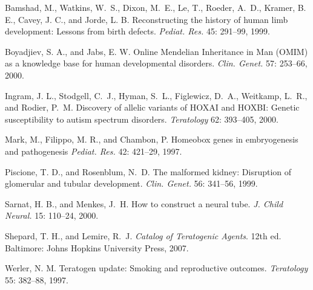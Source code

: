 \begin{references}



\item Bamshad, M., Watkins, W.~S., Dixon, M.~E., Le, T., Roeder, A.~D.,
Kramer, B. E., Cavey, J. C., and Jorde, L. B.
Reconstructing the history of human limb development:
Lessons from birth defects. {\it Pediat. Res.} 45: 291--99, 1999.

\item Boyadjiev, S. A., and Jabs, E. W.
Online Mendelian Inheritance in Man (OMIM) as a knowledge base
for human developmental disorders.  {\it Clin. Genet.}  57: 253--66, 2000.

\item Ingram, J. L., Stodgell, C.~J., Hyman, S.~L., Figlewicz, D.~A.,
Weitkamp, L.~R., and Rodier, P.~M.
Discovery of allelic variants of HOXAI and HOXBI:
Genetic susceptibility to autism spectrum disorders.
 {\it Teratology} 62: 393--405, 2000.

\item Mark, M., Filippo, M. R., and Chambon, P.
Homeobox genes in embryogenesis and pathogenesis {\it Pediat. Res.} 
42: 421--29, 1997.

\item Piscione, T. D., and Rosenblum, N.~D. 
The malformed kidney: Disruption of glomerular and tubular development.
 {\it Clin. Genet.}  56: 341--56, 1999.

\item Sarnat, H. B., and Menkes, J.~H.  How to construct a neural tube.
{\it J. Child Neural.}  15: 110--24, 2000.

\item Shepard, T. H., and Lemire, R.~J.  {\it Catalog of Teratogenic Agents}. 
12th ed. Baltimore: Johns Hopkins University Press, 2007.

\item Werler, N. M.  Teratogen update: Smoking and reproductive outcomes. 
{\it Teratology} 55: 382--88, 1997.

\end{references}

